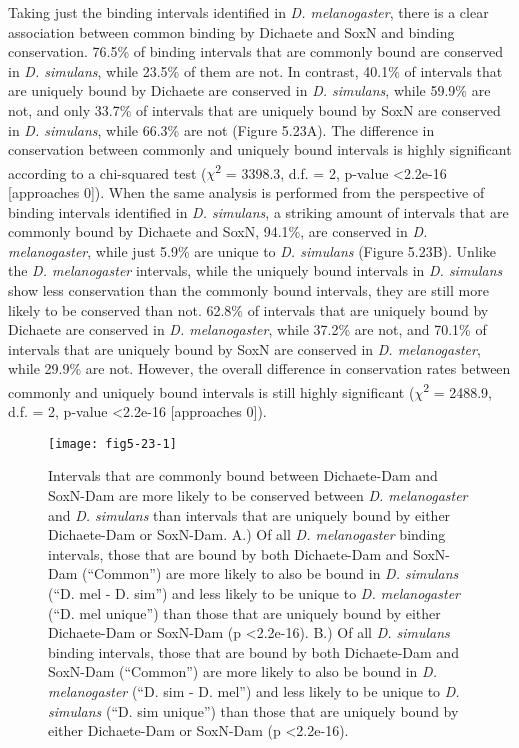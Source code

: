 Taking just the binding intervals identified in \emph{D. melanogaster}, there is a clear association between common binding by Dichaete and SoxN and binding conservation. 76.5\% of binding intervals that are commonly bound are conserved in \emph{D. simulans}, while 23.5\% of them are not. In contrast, 40.1\% of intervals that are uniquely bound by Dichaete are conserved in \emph{D. simulans}, while 59.9\% are not, and only 33.7\% of intervals that are uniquely bound by SoxN are conserved in \emph{D. simulans}, while 66.3\% are not (Figure 5.23A). The difference in conservation between commonly and uniquely bound intervals is highly significant according to a chi-squared test (\(\chi\)\textsuperscript{2} = 3398.3, d.f. = 2, p-value \textless 2.2e-16 [approaches 0]). When the same analysis is performed from the perspective of binding intervals identified in \emph{D. simulans}, a striking amount of intervals that are commonly bound by Dichaete and SoxN, 94.1\%, are conserved in \emph{D. melanogaster}, while just 5.9\% are unique to \emph{D. simulans} (Figure 5.23B). Unlike the \emph{D. melanogaster} intervals, while the uniquely bound intervals in \emph{D. simulans} show less conservation than the commonly bound intervals, they are still more likely to be conserved than not. 62.8\% of intervals that are uniquely bound by Dichaete are conserved in \emph{D. melanogaster}, while 37.2\% are not, and 70.1\% of intervals that are uniquely bound by SoxN are conserved in \emph{D. melanogaster}, while 29.9\% are not. However, the overall difference in conservation rates between commonly and uniquely bound intervals is still highly significant (\(\chi\)\textsuperscript{2} = 2488.9, d.f. = 2, p-value \textless 2.2e-16 [approaches 0]).\\

\begin{figure}
\centering
\texttt{[image: fig5-23-1]}
\caption{Intervals that are commonly bound between Dichaete-Dam and SoxN-Dam are more likely to be conserved between \emph{D. melanogaster} and \emph{D. simulans} than intervals that are uniquely bound by either Dichaete-Dam or SoxN-Dam. A.) Of all \emph{D. melanogaster} binding intervals, those that are bound by both Dichaete-Dam and SoxN-Dam (“Common”) are more likely to also be bound in \emph{D. simulans} (“D. mel - D. sim”) and less likely to be unique to \emph{D. melanogaster} (“D. mel unique”) than those that are uniquely bound by either Dichaete-Dam or SoxN-Dam (p \textless 2.2e-16). B.) Of all \emph{D. simulans} binding intervals, those that are bound by both Dichaete-Dam and SoxN-Dam (“Common”) are more likely to also be bound in \emph{D. melanogaster} (“D. sim - D. mel”) and less likely to be unique to \emph{D. simulans} (“D. sim unique”) than those that are uniquely bound by either Dichaete-Dam or SoxN-Dam (p \textless 2.2e-16).}
\label{Figure 5.23}
\end{figure}

